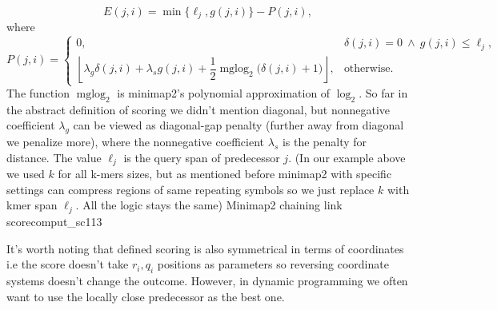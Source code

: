 \begin{equation}
 E(j,i)=\min\{\ell_j,g(j,i)\}-P(j,i),
\label{eq:chaining-link-score}
\end{equation}
where
\begin{equation}
P(j,i)=
\begin{cases}
0,
  & \delta(j,i)=0\ \land\ g(j,i)\leq\ell_j,\\[2pt]
\left\lfloor
  \lambda_g\delta(j,i)+\lambda_s g(j,i)
  +\dfrac{1}{2}\operatorname{mglog}_{2}\!\bigl(\delta(j,i)+1\bigr)
\right\rfloor,
  & \text{otherwise}.
\end{cases}
\label{eq:chaining-penalty}
\end{equation}
The function \(\operatorname{mglog}_{2}\) is minimap2's polynomial
approximation of \(\log_2\). So far in the abstract definition of scoring we didn't mention diagonal, but nonnegative coefficient \(\lambda_g\) can be viewed as diagonal-gap penalty (further away from diagonal we penalize more), where the nonnegative coefficient \(\lambda_s\) is the penalty for distance. The value \(\ell_j\) is the
query span of predecessor \(j\). (In our example above we used $k$ for all k-mers sizes, but as mentioned before minimap2 with specific settings can compress regions of same repeating symbols so we just replace $k$ with kmer span $\ell_j$. All the logic stays the same) 
{Minimap2 chaining link score}{comput_sc}{113}


It's worth noting that defined scoring is also symmetrical in terms of coordinates i.e the score doesn't take $r_i, q_i$ positions as parameters so reversing coordinate systems doesn't change the outcome.
However, in dynamic programming we often want to use the locally close predecessor as the best one. 

